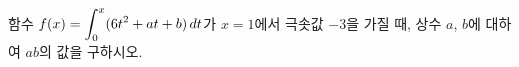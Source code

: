 함수 $f(x)=\displaystyle\int_{0}^{x} (6t^2+at+b)\mkern3mu dt$가 $x=1$에서 극솟값 $-3$을 가질 때, 상수 $a$, $b$에 대하여 $ab$의 값을 구하시오.
